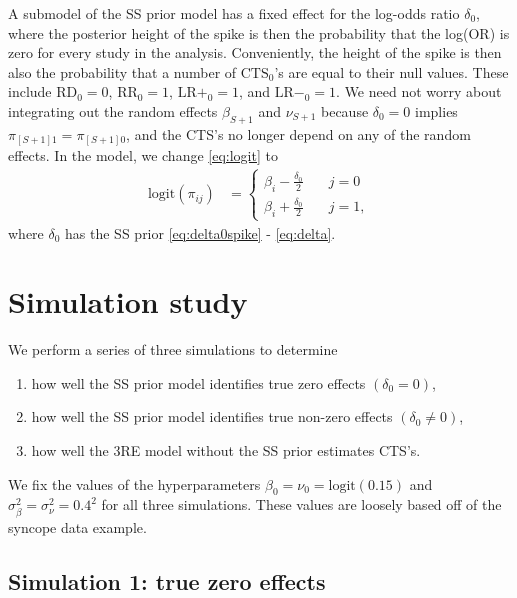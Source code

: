 \documentclass[AMA,STIX1COL]{WileyNJD-v2}
\begin{document}
A submodel of the SS prior model has a fixed effect for the log-odds ratio $\delta_0$, where the posterior height of the spike is then the probability that the log(OR) is zero for every study in the analysis. Conveniently, the height of the spike is then also the probability that a number of $\mbox{CTS}_0$'s are equal to their null values. These include $\mbox{RD}_0 = 0$, $\mbox{RR}_0 = 1$, $\mbox{LR}+_0 = 1$, and $\mbox{LR}-_0 = 1$. We need not worry about integrating out the random effects $\beta_{S+1}$ and $\nu_{S+1}$ because $\delta_0 = 0$ implies $\pi_{[S+1]1} = \pi_{[S+1]0}$, and the CTS's no longer depend on any of the random effects. In the model, we change \eqref{eq:logit} to 
\begin{align}
\mbox{logit}(\pi_{ij}) & =  \left\{
                  \begin{array}{ll}
                    \beta_{i} - \frac{\delta_0}{2} & \quad j=0 \\ 
                    \beta_{i} + \frac{\delta_0}{2} & \quad j=1,
                  \end{array}
                \right. \label{eq:fixed_logit}
\end{align}
where $\delta_0$ has the SS prior \eqref{eq:delta0spike} - \eqref{eq:delta}.

\section{Simulation study} \label{sec:simulation}

We perform a series of three simulations to determine 
\begin{enumerate}
\item{how well the SS prior model identifies true zero effects $(\delta_0 = 0)$,}
\item{how well the SS prior model identifies true non-zero effects $(\delta_0 \ne 0)$,}
\item{how well the 3RE model without the SS prior estimates CTS's.}
\end{enumerate}
\noindent We fix the values of the hyperparameters $\beta_0 = \nu_0 = \mbox{logit}(0.15)$ and $\sigma_\beta^2 = \sigma_\nu^2 = 0.4^2$ for all three simulations. These values are loosely based off of the syncope data example. 

\subsection{Simulation 1: true zero effects} \label{sec:sim_zero}
\end{document}
